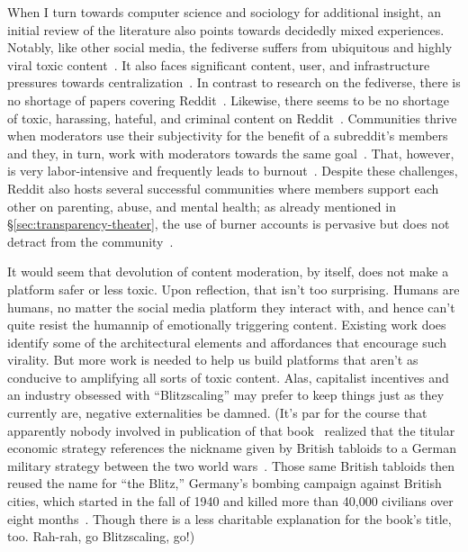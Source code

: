 When I turn towards computer science and sociology for additional insight, an
initial review of the literature also points towards decidedly mixed experiences.
Notably, like other social media, the fediverse suffers from ubiquitous and
highly viral toxic content~\cite{BinZiaRamanea2022}. It also faces significant
content, user, and infrastructure pressures towards
centralization~\cite{RamanJoglekarea2019}. In contrast to research on the
fediverse, there is no shortage of papers covering
Reddit~\cite{ProferesJonesea2021}. Likewise, there seems to be no shortage of
toxic, harassing, hateful, and criminal content on
Reddit~\cite{KwonShao2021,Massanari2017,RiegerKumpelea2021}. Communities thrive
when moderators use their subjectivity for the benefit of a subreddit's members
and they, in turn, work with moderators towards the same
goal~\cite{Gibson2019,SeeringWangea2019}. That, however, is very labor-intensive
and frequently leads to burnout~\cite{SchopkeGonzalezAtrejaea2022}. Despite
these challenges, Reddit also hosts several successful communities where members
support each other on parenting, abuse, and mental health; as already mentioned
in \S\ref{sec:transparency-theater}, the use of burner accounts is pervasive but
does not detract from the
community~\cite{AmmariSchoenebeckea2019,AndalibiHaimsonea2016,ChoudhuryDe2014,Leavitt2015,PavalanathanDeChoudhury2015,SchradingOvesdotterAlmea2015}.

It would seem that devolution of content moderation, by itself, does not make a
platform safer or less toxic. Upon reflection, that isn't too surprising. Humans
are humans, no matter the social media platform they interact with, and hence
can't quite resist the humannip of emotionally triggering content. Existing work
does identify some of the architectural elements and affordances that encourage
such virality. But more work is needed to help us build platforms that aren't as
conducive to amplifying all sorts of toxic content. Alas, capitalist incentives
and an industry obsessed with ``Blitzscaling'' may prefer to keep things just as
they currently are, negative externalities be damned. (It's par for the course
that apparently nobody involved in publication of that
book~\cite{HoffmanYeh2018} realized that the titular economic strategy
references the nickname given by British tabloids to a German military strategy
between the two world wars~\cite{Fanning1997}. Those same British tabloids then
reused the name for ``the Blitz,'' Germany's  bombing campaign against
British cities, which started in the fall of 1940 and killed more than 40,000
civilians over eight months~\cite{WikipediaEditors2023}. Though there is a less
charitable explanation for the book's title, too. Rah-rah, go Blitzscaling, go!)

